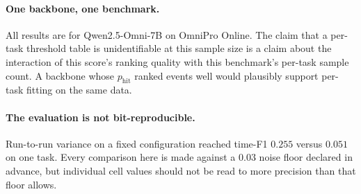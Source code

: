 \paragraph{One backbone, one benchmark.} All results are for Qwen2.5-Omni-7B on
OmniPro Online. The claim that a per-task threshold table is unidentifiable at this
sample size is a claim about the interaction of this score's ranking quality with
this benchmark's per-task sample count. A backbone whose $p_{\mathrm{hit}}$ ranked
events well would plausibly support per-task fitting on the same data.

\paragraph{The evaluation is not bit-reproducible.} Run-to-run variance on a fixed
configuration reached time-F1 $0.255$ versus $0.051$ on one task. Every comparison
here is made against a $0.03$ noise floor declared in advance, but individual cell
values should not be read to more precision than that floor allows.
